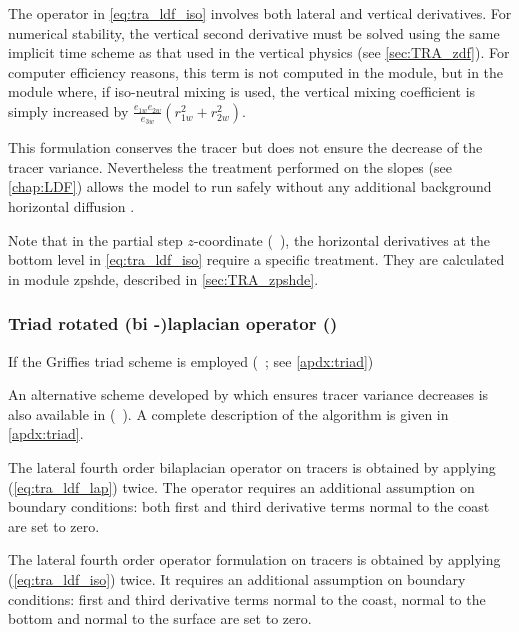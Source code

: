 \documentclass[../main/NEMO_manual]{subfiles}
\begin{document}
The operator in \autoref{eq:tra_ldf_iso} involves both lateral and vertical derivatives.
For numerical stability, the vertical second derivative must be solved using the same implicit time scheme as that
used in the vertical physics (see \autoref{sec:TRA_zdf}).
For computer efficiency reasons, this term is not computed in the  module,
but in the  module where, if iso-neutral mixing is used,
the vertical mixing coefficient is simply increased by $\frac{e_{1w} e_{2w}}{e_{3w}}(r_{1w}^2 + r_{2w}^2)$.

This formulation conserves the tracer but does not ensure the decrease of the tracer variance.
Nevertheless the treatment performed on the slopes (see \autoref{chap:LDF}) allows the model to run safely without
any additional background horizontal diffusion \citep{Guilyardi_al_CD01}.

Note that in the partial step $z$-coordinate (~),
the horizontal derivatives at the bottom level in \autoref{eq:tra_ldf_iso} require a specific treatment.
They are calculated in module zpshde, described in \autoref{sec:TRA_zpshde}.

\subsubsection{Triad rotated (bi -)laplacian operator (\protect{})}
\label{subsec:TRA_ldf_triad}

If the Griffies triad scheme is employed (~; see \autoref{apdx:triad})

An alternative scheme developed by \cite{Griffies_al_JPO98} which ensures tracer variance decreases
is also available in \NEMO (~).
A complete description of the algorithm is given in \autoref{apdx:triad}.

The lateral fourth order bilaplacian operator on tracers is obtained by applying (\autoref{eq:tra_ldf_lap}) twice.
The operator requires an additional assumption on boundary conditions:
both first and third derivative terms normal to the coast are set to zero.

The lateral fourth order operator formulation on tracers is obtained by applying (\autoref{eq:tra_ldf_iso}) twice.
It requires an additional assumption on boundary conditions:
first and third derivative terms normal to the coast,
normal to the bottom and normal to the surface are set to zero.
\end{document}
